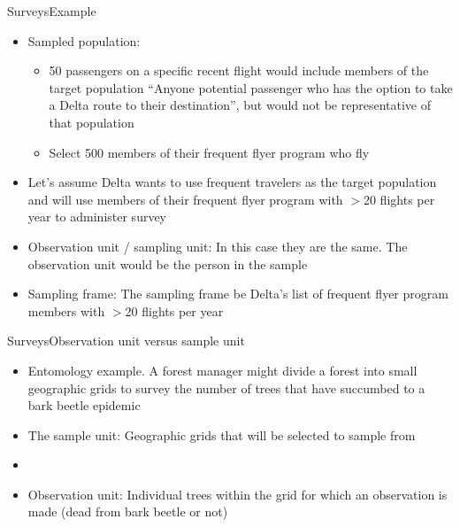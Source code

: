 \documentclass[xcolor=dvipsnames]{beamer}
\begin{document}
\begin{frame}{Surveys}{Example}
	\begin{itemize}
		\item Sampled population: \pause
		\begin{itemize}
			\item 50 passengers on a specific recent flight would include members of the target population ``Anyone potential passenger who has the option to take a Delta route to their destination'', but would not be representative of that population \pause
			\item Select 500 members of their frequent flyer program who fly \pause
		\end{itemize}
	
	\item Let's assume Delta wants to use frequent travelers as the target population and will use members of their frequent flyer program with $>$20 flights per year to administer survey \pause
	
	\item Observation unit / sampling unit: In this case they are the same. The observation unit would be the person in the sample \pause
	
	\item Sampling frame: The sampling frame be Delta's list of frequent flyer program members with $>$20 flights per year
	\end{itemize}
\end{frame}

\begin{frame}{Surveys}{Observation unit versus sample unit}
\begin{itemize}
	\item  Entomology example. A forest manager might divide a forest into small geographic grids to survey the number of trees that have succumbed to a bark beetle epidemic \pause
\end{itemize}
	\begin{itemize}
		\item The sample unit: Geographic grids that will be selected to sample from \pause
		\item[]
		\item Observation unit: Individual trees within the grid for which an observation is made (dead from bark beetle or not) \pause
	\end{itemize}
\end{frame}
\end{document}
